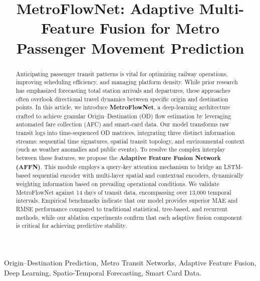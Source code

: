 \documentclass[conference]{IEEEtran}
\begin{document}
\title{MetroFlowNet: Adaptive Multi-Feature Fusion for Metro Passenger Movement Prediction}

\author{
}

\maketitle

\begin{abstract}
Anticipating passenger transit patterns is vital for optimizing railway operations, improving scheduling efficiency, and managing platform density. While prior research has emphasized forecasting total station arrivals and departures, these approaches often overlook directional travel dynamics between specific origin and destination points. In this article, we introduce \textbf{MetroFlowNet}, a deep-learning architecture crafted to achieve granular Origin--Destination (OD) flow estimation by leveraging automated fare collection (AFC) and smart-card data. Our model transforms raw transit logs into time-sequenced OD matrices, integrating three distinct information streams: sequential time signatures, spatial transit topology, and environmental context (such as weather anomalies and public events). To resolve the complex interplay between these features, we propose the \textbf{Adaptive Feature Fusion Network (AFFN)}. This module employs a query-key attention mechanism to bridge an LSTM-based sequential encoder with multi-layer spatial and contextual encoders, dynamically weighting information based on prevailing operational conditions. We validate MetroFlowNet against 14 days of transit data, encompassing over 13,000 temporal intervals. Empirical benchmarks indicate that our model provides superior MAE and RMSE performance compared to traditional statistical, tree-based, and recurrent methods, while our ablation experiments confirm that each adaptive fusion component is critical for achieving predictive stability.
\end{abstract}

\begin{IEEEkeywords}
Origin--Destination Prediction, Metro Transit Networks, Adaptive Feature Fusion, Deep Learning, Spatio-Temporal Forecasting, Smart Card Data.
\end{IEEEkeywords}
\end{document}
